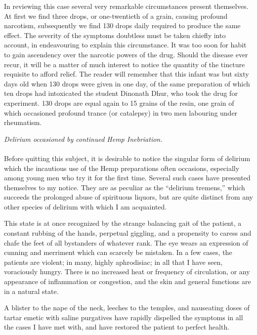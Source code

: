 \documentclass[a4paper, 11pt, oneside, polutonikogreek, english]{article}
\begin{document}
In reviewing this case several very remarkable circumstances present themselves. At first we find three drops, or one-twentieth of a grain, causing profound narcotism, subsequently we find 130 drops daily required to produce the same effect. The severity of the symptoms doubtless must be taken chiefly into account, in endeavouring to explain this circumstance. It was too soon for habit to gain ascendency over the narcotic powers of the drug. Should the disease ever recur, it will be a matter of much interest to notice the quantity of the tincture requisite to afford relief. The reader will remember that this infant was but sixty days old when 130 drops were given in one day, of the same preparation of which ten drops had intoxicated the student Dinonath Dhur, who took the drug for experiment. 130 drops are equal again to 15 grains of the resin, one grain of which occasioned profound trance (or catalepsy) in two men labouring under rheumatism.
\begin{center}
\emph{Delirium occasioned by continued Hemp Inebriation.}
\end{center}
\paragraph{}
Before quitting this subject, it is desirable to notice the singular form of delirium which the incautious use of the Hemp preparations often occasions, especially among young men who try it for the first time. Several such cases have presented themselves to my notice. They are as peculiar as the ``delirium tremens,'' which succeeds the prolonged abuse of spirituous liquors, but are quite distinct from any other species of delirium with which I am acquainted.

This state is at once recognized by the strange balancing gait of the patient, a constant rubbing of the hands, perpetual giggling, and a propensity to caress and chafe the feet of all bystanders of whatever rank. The eye wears an expression of cunning and merriment which can scarcely be mistaken. In a few cases, the patients are violent; in many, highly aphrodisiac; in all that I have seen, voraciously hungry. There is no increased heat or frequency of circulation, or any appearance of inflammation or congestion, and the skin and general functions are in a natural state.

A blister to the nape of the neck, leeches to the temples, and nauseating doses of tartar emetic with saline purgatives have rapidly dispelled the symptoms in all the cases I have met with, and have restored the patient to perfect health.
\end{document}
